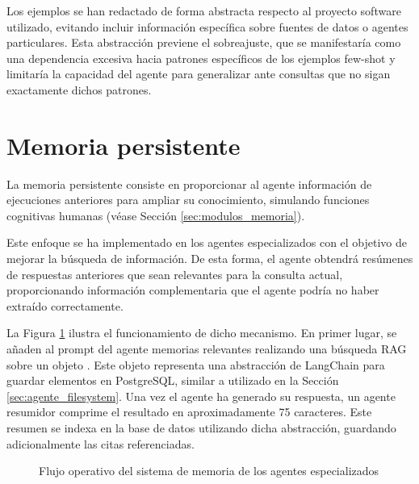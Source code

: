 Los ejemplos se han redactado de forma abstracta respecto al proyecto software utilizado, evitando incluir información específica sobre fuentes de datos o agentes particulares. Esta abstracción previene el sobreajuste, que se manifestaría como una dependencia excesiva hacia patrones específicos de los ejemplos few-shot y limitaría la capacidad del agente para generalizar ante consultas que no sigan exactamente dichos patrones.

\section{Memoria persistente}
La memoria persistente consiste en proporcionar al agente información de ejecuciones anteriores para ampliar su conocimiento, simulando funciones cognitivas humanas (véase Sección \ref{sec:modulos_memoria}).

Este enfoque se ha implementado en los agentes especializados con el objetivo de mejorar la búsqueda de información. De esta forma, el agente obtendrá resúmenes de respuestas anteriores que sean relevantes para la consulta actual, proporcionando información complementaria que el agente podría no haber extraído correctamente.

La Figura \ref{fig:memoria_1} ilustra el funcionamiento de dicho mecanismo. En primer lugar, se añaden al prompt del agente memorias relevantes realizando una búsqueda RAG sobre un objeto . Este objeto representa una abstracción de LangChain para guardar elementos en PostgreSQL, similar a  utilizado en la Sección \ref{sec:agente_filesystem}. Una vez el agente ha generado su respuesta, un agente resumidor comprime el resultado en aproximadamente 75 caracteres. Este resumen se indexa en la base de datos utilizando dicha abstracción, guardando adicionalmente las citas referenciadas. 

\begin{figure}[h]
\centering
{}
\caption{Flujo operativo del sistema de memoria de los agentes especializados}
\label{fig:memoria_1}
\end{figure}

